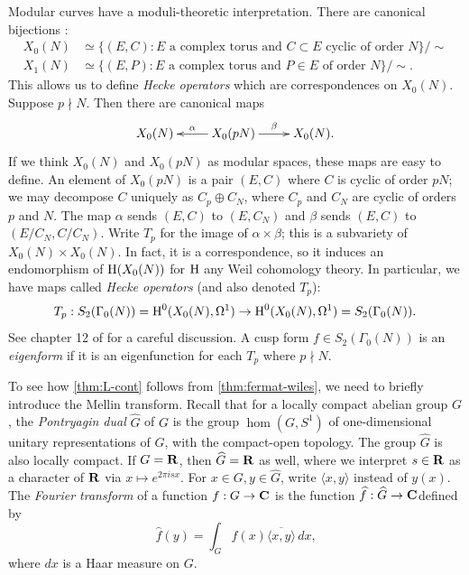 Modular curves have a moduli-theoretic interpretation. There are canonical 
bijections \cite[1.5]{ds05}:
\begin{align*}
  X_0(N) &\simeq \{(E,C):\text{$E$ a complex torus and $C\subset E$ cyclic of order $N$}\}/\sim  \\
  X_1(N) &\simeq \{(E,P):\text{$E$ a complex torus and $P\in E$ of order $N$}\}/\sim \text{.}
\end{align*}
This allows us to define \emph{Hecke operators} which are correspondences on 
$X_0(N)$. Suppose $p\nmid N$. Then there are canonical maps 
\[\xymatrix{
  X_0(N) 
    & \ar[l]_-\alpha X_0(p N) \ar[r]^-\beta 
    & X_0(N) \text{.}
}\]
If we think $X_0(N)$ and $X_0(p N)$ as modular spaces, these maps are easy to 
define. An element of $X_0(p N)$ is a pair $(E,C)$ where $C$ is cyclic of order 
$p N$; we may decompose $C$ uniquely as $C_p\oplus C_N$, where $C_p$ and $C_N$ 
are cyclic of orders $p$ and $N$. The map $\alpha$ sends $(E,C)$ to 
$(E,C_N)$ and $\beta$ sends $(E,C)$ to $(E/C_N,C/C_N)$. Write 
$T_p$ for the image of $\alpha\times \beta$; this is a subvariety of 
$X_0(N)\times X_0(N)$. In fact, it is a correspondence, so it induces an 
endomorphism of $\operatorname{H}(X_0(N))$ for $\operatorname{H}$ any Weil cohomology theory. In 
particular, we have maps called \emph{Hecke operators} (and also denoted 
$T_p$):
\[
  T_p:S_2(\Gamma_0(N)) = \operatorname{H}^0(X_0(N),\Omega^1) \to \operatorname{H}^0(X_0(N),\Omega^1) = S_2(\Gamma_0(N)) \text{.}
\]
See chapter 12 of \cite{rs11} for a careful discussion. A cusp form 
$f\in S_2(\Gamma_0(N))$ is an \emph{eigenform} if it is an eigenfunction for 
each $T_p$ where $p\nmid N$. 

To see how \autoref{thm:L-cont} follows from \autoref{thm:fermat-wiles}, we 
need to briefly introduce the Mellin transform. Recall 
that for a locally 
compact abelian group $G$, the \emph{Pontryagin dual} $\widehat G$ of $G$ is 
the group $\hom(G,S^1)$ of one-dimensional unitary representations of $G$, with 
the compact-open topology. The group $\widehat G$ is also locally compact. If 
$G=\mathbf{R}$, then $\widehat G=\mathbf{R}$ as well, where we interpret $s\in \mathbf{R}$ as a 
character of $\mathbf{R}$ via $x\mapsto e^{2\pi i s x}$. For 
$x\in G,y\in \widehat G$, write $\langle x,y\rangle$ instead of $y(x)$. The 
\emph{Fourier transform} of a function $f:G\to \mathbf{C}$ is the function 
$\widehat f:\widehat G\to \mathbf{C}$defined by 
\[
  \widehat f(y) = \int_G f(x) \overline{\langle x,y\rangle}\, dx \text{,}
\]
where $d x$ is a Haar measure on $G$. 

